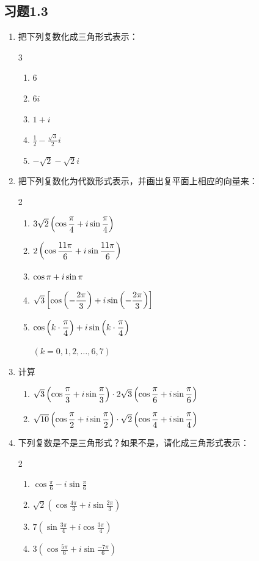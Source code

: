 \subsection*{习题1.3}
\begin{enumerate}
    \item 把下列复数化成三角形式表示：
\begin{multicols}{3}
\begin{enumerate}[(1)]
    \item 6
    \item $6i$
    \item $1+i$
    \item $\frac{1}{2}-\frac{\sqrt{3}}{2}i$
    \item $-\sqrt{2}-\sqrt{2}i$
\end{enumerate}
\end{multicols}

\item 把下列复数化为代数形式表示，并画出复平面上相应的向量来：
\begin{multicols}{2}
\begin{enumerate}[(1)]
    \item $3\sqrt{2}\left(\cos{\dfrac{\pi}{4}}+i\sin{\dfrac{\pi}{4}}\right)$
    \item $2\left(\cos{\dfrac{11\pi}{6}}+i\sin{\dfrac{11\pi}{6}}\right)$
    \item $\cos{\pi}+i\sin{\pi}$
    \item $\sqrt{3}\left[\cos\left(-\dfrac{2\pi}{3}\right)+i\sin\left(-\dfrac{2\pi}{3}\right)\right]$
    \item $\cos\left(k\cdot \dfrac{\pi}{4}\right)+i\sin\left(k\cdot \dfrac{\pi}{4}\right)$
    
    $(k=0,1,2,\ldots,6,7)$
\end{enumerate}
\end{multicols}

\item 计算
\begin{enumerate}[(1)]
    \item $\sqrt{3}\left(\cos{\dfrac{\pi}{3}}+i\sin{\dfrac{\pi}{3}}\right)\cdot 2\sqrt{3}\left(\cos{\dfrac{\pi}{6}}+i\sin{\dfrac{\pi}{6}}\right)$
    \item $\sqrt{10}\left(\cos{\dfrac{\pi}{2}}+i\sin{\dfrac{\pi}{2}}\right)\cdot \sqrt{2}\left(\cos{\dfrac{\pi}{4}}+i\sin{\dfrac{\pi}{4}}\right)$
\end{enumerate}

\item 下列复数是不是三角形式？如果不是，请化成三角形式表示：
\begin{multicols}{2}
\begin{enumerate}[(1)]
    \item $\cos\frac{\pi}{6}-i\sin\frac{\pi}{6}$
    \item $\sqrt{2}\left(\cos\frac{4\pi}{3}+i\sin\frac{2\pi}{3}\right)$
    \item $7\left(\sin\frac{3\pi}{4}+i\cos\frac{3\pi}{4}\right)$
    \item $3\left(\cos\frac{5\pi}{6}+i\sin\frac{-7\pi}{6}\right)$
\end{enumerate}
\end{multicols}


\end{enumerate}
